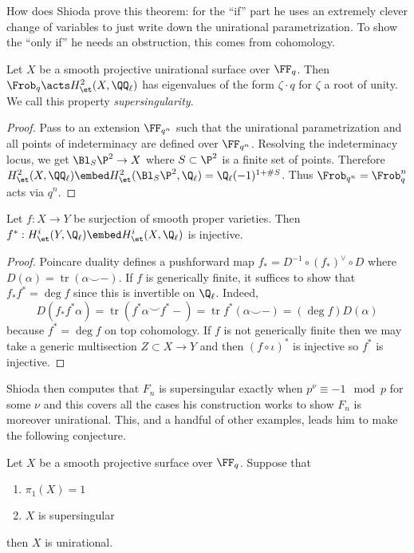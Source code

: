\documentclass[12pt]{article}
\renewcommand{\tr}{\operatorname{tr}}
\begin{document}
How does Shioda prove this theorem: for the ``if'' part he uses an extremely clever change of variables to just write down the unirational parametrization. To show the ``only if'' he needs an obstruction, this comes from \etale cohomology. 

\begin{prop}
Let $X$ be a smooth projective unirational surface over $\FF_q$. Then $\Frob_q \acts H^2_{\et}(X, \QQ_\ell)$ has eigenvalues of the form $\zeta \cdot q$ for $\zeta$ a root of unity. We call this property \textit{supersingularity}. 
\end{prop}

\begin{proof}
Pass to an extension $\FF_{q^n}$ such that the unirational parametrization and all points of indeterminacy are defined over $\FF_{q^n}$. Resolving the indeterminacy locus, we get $\Bl_S \P^2 \to X$ where $S \subset \P^2$ is a finite set of points. Therefore $H^2_{\et}(X, \QQ_\ell) \embed H^2_{\et}(\Bl_S \P^2, \Q_\ell) = \Q_\ell(-1)^{1 + \# S}$. Thus $\Frob_{q^n} = \Frob_{q}^n$ acts via $q^n$.  
\end{proof}


\begin{lemma}
Let $f : X \to Y$ be surjection of smooth proper varieties. Then $f^* : H^i_{\et}(Y, \Q_\ell) \embed H^i_{\et}(X, \Q_\ell)$ is injective.
\end{lemma}

\begin{proof}
Poincare duality defines a pushforward map $f_* = D^{-1} \circ (f_*)^{\vee} \circ D$ where $D(\alpha) = \tr{(\alpha \smile -)}$. If $f$ is generically finite, it suffices to show that $f_* f^* = \deg{f}$ since this is invertible on $\Q_\ell$. Indeed, 
\[ D(f_* f^* \alpha) = \tr{(f^* \alpha \smile f^* - )} = \tr{f^* (\alpha \smile -)} = (\deg{f}) D(\alpha) \]
because $f^* = \deg{f}$ on top cohomology. If $f$ is not generically finite then we may take a generic multisection $Z \subset X \to Y$ and then $(f \circ \iota)^*$ is injective so $f^*$ is injective.
\end{proof}

Shioda then computes that $F_n$ is supersingular exactly when $p^\nu \equiv - 1 \mod p$ for some $\nu$ and this covers all the cases his construction works to show $F_n$ is moreover unirational. This, and a handful of other examples, leads him to make the following conjecture.

\begin{conj}[Shioda]
Let $X$ be a smooth projective surface over $\FF_q$. Suppose that
\begin{enumerate}
\item $\pi_1(X) = 1$
\item $X$ is supersingular
\end{enumerate}
then $X$ is unirational.
\end{conj}
\end{document}
